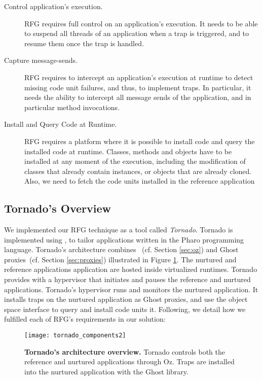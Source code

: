\begin{description}
\item[Control application's execution.] RFG requires full control on an application's execution. It needs to be able to suspend all threads of an application when a trap is triggered, and to resume them once the trap is handled.

\item[Capture message-sends.] RFG requires to intercept an application's execution at runtime to detect missing code unit failures, and thus, to implement traps. In particular, it needs the ability to intercept all message sends of the application, and in particular method invocations.

\item[Install and Query Code at Runtime.] RFG requires a platform where it is possible to install code and query the installed code at runtime. Classes, methods and objects have to be installed at any moment of the execution, including the modification of classes that already contain instances, or objects that are already cloned. Also, we need to fetch the code units installed in the reference application 
\end{description}

\subsection{Tornado's Overview}\label{sec:infrastructure}

We implemented our RFG technique as a tool called \emph{Tornado}. Tornado is implemented using \Vtt, to tailor applications written in the Pharo programming language.
Tornado's architecture combines \Vtt~(cf. Section \ref{sec:oz}) and Ghost proxies~(cf. Section \ref{sec:proxies}) illustrated in Figure \ref{fig:tornado_code units}. The nurtured and reference applications application are hosted inside virtualized runtimes. Tornado provides with a hypervisor that initiates and pauses the reference and nurtured applications. Tornado's hypervisor runs and monitors the nurtured application. It installs traps on the nurtured application as Ghost proxies, and use the object space interface to query and install code units it. Following, we detail how we fulfilled each of RFG's requirements in our solution:

\begin{figure}[ht]
\begin{center}
\texttt{[image: tornado\_components2]}
\caption{\small\textbf{Tornado's architecture overview.} Tornado controls both the reference and nurtured applications through Oz. Traps are installed into the nurtured application with the Ghost library.\label{fig:tornado_code units}}
\end{center}
\end{figure}

